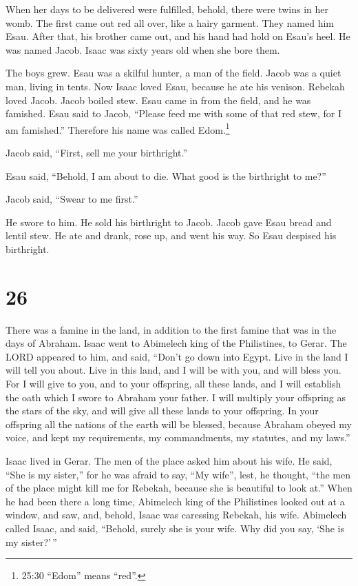  When her days to be delivered were fulfilled, behold,
there were twins in her womb.  The first came out red all
over, like a hairy garment. They named him Esau.  After
that, his brother came out, and his hand had hold on Esau's heel. He was
named Jacob. Isaac was sixty years old when she bore them.

 The boys grew. Esau was a skilful hunter, a man of the
field. Jacob was a quiet man, living in tents.  Now Isaac
loved Esau, because he ate his venison. Rebekah loved Jacob.
 Jacob boiled stew. Esau came in from the field, and he was
famished.  Esau said to Jacob, ``Please feed me with some
of that red stew, for I am famished.'' Therefore his name was called
Edom.\footnote{25:30 ``Edom'' means ``red''.}

 Jacob said, ``First, sell me your birthright.''

 Esau said, ``Behold, I am about to die. What good is the
birthright to me?''

 Jacob said, ``Swear to me first.''

He swore to him. He sold his birthright to Jacob.  Jacob
gave Esau bread and lentil stew. He ate and drank, rose up, and went his
way. So Esau despised his birthright.

\hypertarget{section-25}{%
\section{26}\label{section-25}}

 There was a famine in the land, in addition to the first
famine that was in the days of Abraham. Isaac went to Abimelech king of
the Philistines, to Gerar.  The LORD appeared to him, and
said, ``Don't go down into Egypt. Live in the land I will tell you
about.  Live in this land, and I will be with you, and will
bless you. For I will give to you, and to your offspring, all these
lands, and I will establish the oath which I swore to Abraham your
father.  I will multiply your offspring as the stars of the
sky, and will give all these lands to your offspring. In your offspring
all the nations of the earth will be blessed,  because
Abraham obeyed my voice, and kept my requirements, my commandments, my
statutes, and my laws.''

 Isaac lived in Gerar.  The men of the place
asked him about his wife. He said, ``She is my sister,'' for he was
afraid to say, ``My wife'', lest, he thought, ``the men of the place
might kill me for Rebekah, because she is beautiful to look at.''
 When he had been there a long time, Abimelech king of the
Philistines looked out at a window, and saw, and, behold, Isaac was
caressing Rebekah, his wife.  Abimelech called Isaac, and
said, ``Behold, surely she is your wife. Why did you say, `She is my
sister?'\,''


